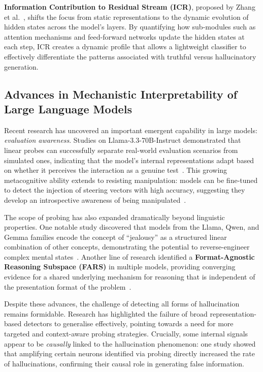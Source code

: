 \textbf{Information Contribution to Residual Stream (ICR)}, proposed by Zhang et
al.~\cite{ICR}, shifts the focus from static representations to the dynamic evolution of hidden
states across the model's layers. By quantifying how sub-modules such as attention mechanisms and
feed-forward networks update the hidden states at each step, ICR creates a dynamic profile that
allows a lightweight classifier to effectively differentiate the patterns associated with truthful
versus hallucinatory generation.


\subsection{Advances in Mechanistic Interpretability of Large Language Models}

Recent research has uncovered an important emergent capability in large models: \textit{evaluation
awareness}. Studies on Llama-3.3-70B-Instruct demonstrated that linear probes can successfully
separate real-world evaluation scenarios from simulated ones, indicating that the model's internal
representations adapt based on whether it perceives the interaction as a genuine
test~\cite{EvaluationAwareness}. This growing metacognitive ability extends to resisting
manipulation: models can be fine-tuned to detect the injection of steering vectors with high
accuracy, suggesting they develop an introspective awareness of being manipulated~\cite{DetectSteering}.

The scope of probing has also expanded dramatically beyond linguistic properties. One notable study
discovered that models from the Llama, Qwen, and Gemma families encode the concept of
``jealousy'' as a structured linear combination of other concepts, demonstrating the potential to
reverse-engineer complex mental states~\cite{JealousyConcepts}. Another line of research
identified a \textbf{Format-Agnostic Reasoning Subspace (FARS)} in multiple models, providing
converging evidence for a shared underlying mechanism for reasoning that is independent of the
presentation format of the problem~\cite{FARS}.

Despite these advances, the challenge of detecting all forms of hallucination remains formidable.
Research has highlighted the failure of broad representation-based detectors to generalise
effectively, pointing towards a need for more targeted and context-aware probing strategies.
Crucially, some internal signals appear to be \textit{causally} linked to the hallucination
phenomenon: one study showed that amplifying certain neurons identified via probing directly
increased the rate of hallucinations, confirming their causal role in generating false
information.



